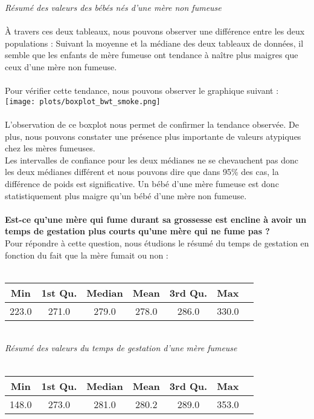 \documentclass[a4paper, 10pt]{article}
\begin{document}
\textit{R\'esum\'e des valeurs des b\'eb\'es n\'es d'une m\`ere non fumeuse}\\ \\
\`A travers ces deux tableaux, nous pouvons observer une diff\'erence entre les deux populations :
Suivant la moyenne et la m\'ediane des deux tableaux de donn\'ees, il semble que les enfants de mère fumeuse
ont tendance \`a na\^itre plus maigres que ceux d'une m\`ere non fumeuse.\\ \\
Pour v\'erifier cette tendance, nous pouvons observer le graphique suivant :\\
\texttt{[image: plots/boxplot\_bwt\_smoke.png]}\\ \\
L'observation de ce boxplot nous permet de confirmer la tendance observ\'ee.
De plus, nous pouvons constater une pr\'esence plus importante de valeurs atypiques chez les m\`eres fumeuses.\\
Les intervalles de confiance pour les deux m\'edianes ne se chevauchent pas donc les deux m\'edianes diff\'erent et nous pouvons
dire que dans 95\% des cas, la différence de poids est significative.
Un b\'eb\'e d'une m\`ere fumeuse est donc statistiquement plus maigre qu'un b\'eb\'e d'une m\`ere non fumeuse.\\ \\
\textbf{Est-ce qu'une m\`ere qui fume durant sa grossesse est encline \`a avoir un temps de gestation plus courts qu'une
m\`ere qui ne fume pas ?}\\
Pour répondre à cette question, nous étudions le résumé du temps de gestation en fonction du fait
que la m\`ere fumait ou non :\\ \\
\begin{tabular}{|c|c|c|c|c|c|c|}
\hline
Min & 1st Qu. & Median & Mean & 3rd Qu. & Max\\
\hline
223.0 & 271.0 & 279.0 & 278.0 & 286.0 & 330.0\\
\hline
\end{tabular}\\
\textit{R\'esum\'e des valeurs du temps de gestation d'une m\`ere fumeuse}\\ \\
\begin{tabular}{|c|c|c|c|c|c|c|}
\hline
Min & 1st Qu. & Median & Mean & 3rd Qu. & Max\\
\hline
148.0 & 273.0 & 281.0 & 280.2 & 289.0 & 353.0\\
\hline
\end{tabular}\\
\end{document}
